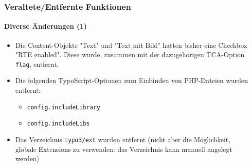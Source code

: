 \begin{frame}[fragile]
	\frametitle{Veraltete/Entfernte Funktionen}
	\framesubtitle{Diverse Änderungen (1)}

	\begin{itemize}

		\item Die Content-Objekte "Text" und "Text mit Bild" hatten bisher eine Checkbox "RTE enabled".
			Diese wurde, zusammen mit der dazugehörigen TCA-Option \texttt{flag}, entfernt.

		\item Die folgenden TypoScript-Optionen zum Einbinden von PHP-Dateien wurden entfernt:

			\begin{itemize}
				\item \texttt{config.includeLibrary}
				\item \texttt{config.includeLibs}
			\end{itemize}

		\item Das Verzeichnis \texttt{typo3/ext} wurden entfernt\newline
			\small
				(nicht aber die Möglichkeit, globale Extensions zu verwenden: das Verzeichnis kann manuell angelegt werden)
			\normalsize

	\end{itemize}

\end{frame}



